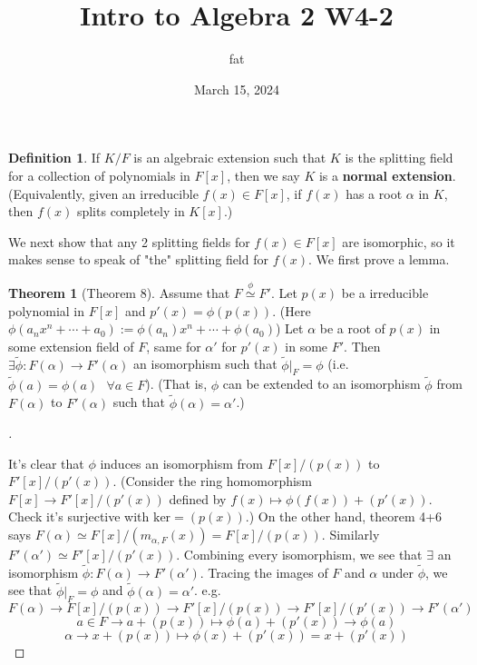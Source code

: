 \documentclass{article}
\title{Intro to Algebra 2 W4-2}
\author{fat}
\date{March 15, 2024}
\newcommand{\sfa}{\text{  } \forall}
\theoremstyle{definition}
\newtheorem{thm}{Theorem}
\newtheorem{dfn}{Definition}
\newenvironment{proofs}[1][\proofname]{%
  \begin{proof}[#1]$ $\par\nobreak\ignorespaces
}{%
  \end{proof}
}
\begin{document}
\maketitle
\thispagestyle{fancy}
\renewcommand{\footrulewidth}{0.4pt}
\cfoot{\thepage}
\renewcommand{\headrulewidth}{0.4pt}

\begin{dfn}
	If $K/F$ is an algebraic extension such that $K$ is the splitting field for a collection of polynomials in $F[x]$, then we say $K$ is a \textbf{normal extension}.
	(Equivalently, given an irreducible $f(x) \in F[x]$, if $f(x)$ has a root $\alpha$ in $K$, then $f(x)$ splits completely in $K[x]$.)
\end{dfn}

We next show that any 2 splitting fields for $f(x) \in F[x]$ are isomorphic, so it makes sense to speak of "the" splitting field for $f(x)$.
We first prove a lemma.

\begin{thm}[Theorem 8]
	Assume that $F \stackrel{\phi}{\simeq} F'$.
	Let $p(x)$ be a irreducible polynomial in $F[x]$ and $p'(x) = \phi(p(x))$. 
	(Here $\phi(a_n x^n + \cdots + a_0) := \phi(a_n) x^n + \cdots + \phi(a_0)$)
	Let $\alpha$ be a root of $p(x)$ in some extension field of $F$, same for $\alpha'$ for $p'(x)$ in some $F'$.
	Then $\exists \tilde{\phi}: F(\alpha) \to F'(\alpha)$ an isomorphism such that $\tilde{\phi}|_F = \phi$ (i.e. $\tilde{\phi}(a) = \phi(a) \sfa a \in F$).
	(That is, $\phi$ can be extended to an isomorphism $\tilde{\phi}$ from $F(\alpha)$ to $F'(\alpha)$ such that $\tilde{\phi}(\alpha) = \alpha'$.)
\end{thm}

\begin{proofs}
	It's clear that $\phi$ induces an isomorphism from $F[x]/(p(x))$ to $F'[x]/(p'(x))$.
	(Consider the ring homomorphism $F[x] \to F'[x]/(p'(x))$ defined by $f(x) \mapsto \phi(f(x)) + (p'(x))$.
	Check it's surjective with $\text{ker} = (p(x))$.)
	On the other hand, theorem 4+6 says $F(\alpha) \simeq F[x]/(m_{\alpha, F}(x)) = F[x]/(p(x))$.
	Similarly $F'(\alpha') \simeq F'[x]/(p'(x))$.
	Combining every isomorphism, we see that $\exists$ an isomorphism $\tilde{\phi}: F(\alpha) \to F'(\alpha')$.
	Tracing the images of $F$ and $\alpha$ under $\tilde{\phi}$, we see that $\tilde{\phi}|_F = \phi$ and $\tilde{\phi}(\alpha) = \alpha'$.
	e.g. 
	\[
		F(\alpha) \to F[x]/(p(x)) \to F'[x]/(p(x)) \to F'[x]/(p'(x)) \to F'(\alpha')
	\]
	\[
		a \in F \to a + (p(x)) \mapsto \phi(a) + (p'(x)) \to \phi(a)
	\]
	\[
		\alpha \to x + (p(x)) \mapsto \phi(x) + (p'(x)) = x + (p'(x))
	\]
	
\end{proofs}
\end{document}
